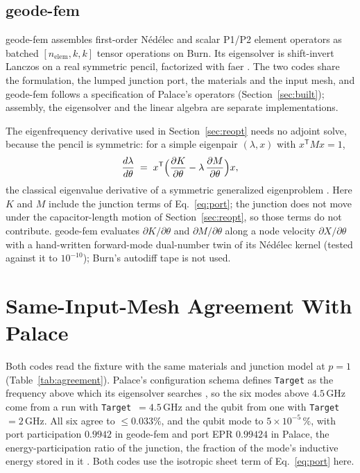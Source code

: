 \documentclass{anvil-paper}
\begin{document}
\subsection{geode-fem}
\label{sec:architecture}

geode-fem assembles first-order N\'ed\'elec \citep{nedelec1980} and scalar
P1/P2 element operators as batched $[n_{\mathrm{elem}},k,k]$ tensor
operations on Burn. Its eigensolver is shift-invert Lanczos \citep{arpack}
on a real symmetric pencil, factorized with faer \citep{kazdadi2026faer}. The two codes share the
formulation, the lumped junction port, the materials and the input mesh,
and geode-fem follows a specification of Palace's operators
(Section~\ref{sec:built}); assembly, the eigensolver and the linear algebra
are separate implementations.

The eigenfrequency derivative used in Section~\ref{sec:reopt} needs no
adjoint solve, because the pencil is symmetric: for a simple eigenpair
$(\lambda, x)$ with $x^{\mathsf T}Mx = 1$,
\begin{equation}
  \frac{d\lambda}{d\theta} \;=\;
  x^{\mathsf T}\Bigl(\frac{\partial K}{\partial\theta}
  - \lambda\,\frac{\partial M}{\partial\theta}\Bigr)x ,
  \label{eq:hf-eig}
\end{equation}
the classical eigenvalue derivative of a symmetric generalized eigenproblem
\citep{foxkapoor1968rates}. Here $K$ and $M$ include the junction terms of
Eq.~\eqref{eq:port}; the junction does not move under the capacitor-length
motion of Section~\ref{sec:reopt}, so those terms do not contribute.
geode-fem evaluates $\partial K/\partial\theta$ and $\partial
M/\partial\theta$ along a node velocity $\partial X/\partial\theta$ with a
hand-written forward-mode dual-number twin of its N\'ed\'elec kernel
(tested against it to $10^{-10}$); Burn's autodiff tape is not used.

\section{Same-Input-Mesh Agreement With Palace}
\label{sec:agreement}

Both codes read the fixture with the same materials and junction model at
$p = 1$ (Table~\ref{tab:agreement}). Palace's configuration schema
defines \texttt{Target} as the frequency above which its eigensolver
searches \citep{palace}, so the six modes above $4.5$\,GHz come from a run
with \texttt{Target}~$=4.5$\,GHz and the qubit from one with
\texttt{Target}~$=2$\,GHz. All six agree to $\leq 0.033\%$, and the qubit mode to $5\times10^{-5}\,\%$, with port
participation $0.9942$ in geode-fem and port EPR $0.99424$ in Palace, the
energy-participation ratio of the junction, the fraction of the mode's
inductive energy stored in it \citep{minev2021energy}. Both codes use the
isotropic sheet term of Eq.~\eqref{eq:port} here.
\end{document}
